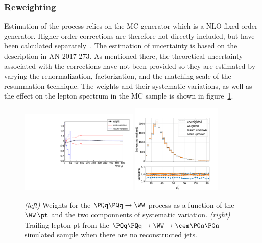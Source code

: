 \subsubsection{\WW \pt Reweighting}
Estimation of the \WW process relies on the \POWHEG MC generator which is a NLO fixed order generator. Higher order corrections are therefore not directly included, but have been calculated separately~\cite{Meade:2014fca, Jaiswal:2014yba, Grazzini:2015wpa}.  The estimation of uncertainty is based on the description in AN-2017-273. As mentioned there, the theoretical uncertainty associated with the corrections have not been provided so they are estimated by varying the renormalization, factorization, and the matching scale of the \pt resummation technique. The weights and their systematic variations, as well as the effect on the lepton \pt spectrum in the \WW MC sample is shown in figure~\ref{fig:analysis:dataset:ww_weight}.

\begin{figure}[ht]
    \centering
    \includegraphics[width=0.5\textwidth]{chapters/Analysis/sectionDataset/figures/ww_pt_weight_variations}
    \includegraphics[width=0.38\textwidth]{chapters/Analysis/sectionDataset/figures/ww_pt_lepton_pt}
    \caption{\emph{(left)} Weights for the $\PQq \PQq \rightarrow \WW$ process as a function of the $\WW\,\pt$ and the two componnents of systematic variation.  \emph{(right)} Trailing lepton pt from the $\PQq \PQq\rightarrow \WW\rightarrow \cem\PGn\PGn$ simulated sample when there are no reconstructed jets.} 
    \label{fig:analysis:dataset:ww_weight}
\end{figure}



